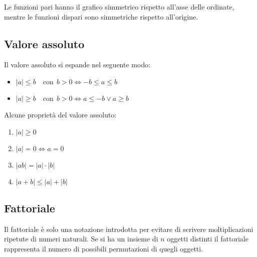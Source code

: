 Le funzioni pari hanno il grafico simmetrico rispetto all'asse delle ordinate, mentre le funzioni dispari sono simmetriche rispetto all'origine.

\subsection{Valore assoluto}


Il valore assoluto si espande nel seguente modo:
\begin{itemize}
    \item $|a| \leq b \quad \mathrm{con}\;\, b > 0 \iff -b \leq a \leq b$
    \item $|a| \geq b \quad \mathrm{con}\;\, b > 0 \iff a \leq -b \lor a \geq b$
\end{itemize}
Alcune proprietà del valore assoluto:
\begin{enumerate}
    \item $|a| \geq 0$
    \item $|a| = 0 \iff a = 0$
    \item $|ab| = |a| \cdot |b|$
    \item $|a + b| \leq |a| + |b|$
\end{enumerate}

\subsection{Fattoriale}
Il fattoriale è solo una notazione introdotta per evitare di scrivere moltiplicazioni ripetute di numeri naturali. Se si ha un insieme di $n$ oggetti distinti il fattoriale rappresenta il numero di possibili permutazioni di quegli oggetti.

